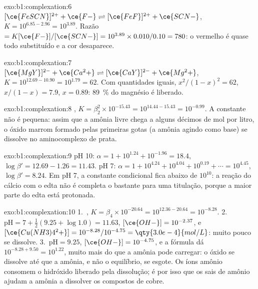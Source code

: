 \begin{solution}{exo:b1:complexation:6}
$[\ce{FeSCN}]^{2+} + \ce{F-} \rightleftharpoons [\ce{FeF}]^{2+} + \ce{SCN-}$,
$K = 10^{6.85 - 2.96} = 10^{3.89}$. Razão $= K[\ce{F-}]/[\ce{SCN-}] =
10^{3.89} \times 0.010/0.10 = 780$: o  vermelho é quase todo
substituído e a cor desaparece.
\end{solution}

\begin{solution}{exo:b1:complexation:7}
$[\ce{MgY}]^{2-} + \ce{Ca^2+} \rightleftharpoons [\ce{CaY}]^{2-} + \ce{Mg^2+}$,
$K = 10^{12.69 - 10.90} = 10^{1.79} = 62$. Com quantidades iguais,
$x^2/(1 - x)^2 = 62$, $x/(1 - x) = 7.9$, $x = 0.89$: \qty{89}{\percent} do
magnésio é liberado.
\end{solution}

\begin{solution}{exo:b1:complexation:8}
, $K = \beta_2^2 \times
10^{-15.43} = 10^{14.44 - 15.43} = 10^{-0.99}$. A constante não é
pequena: assim que a amônia livre chega a alguns décimos de mol por
litro, o óxido marrom formado pelas primeiras gotas (a amônia agindo
como base) se dissolve no aminocomplexo de prata.
\end{solution}

\begin{solution}{exo:b1:complexation:9}
pH 10: $\alpha = 1 + 10^{1.24} + 10^{-1.96} = 18.4$, $\log\beta' = 12.69 -
1.26 = 11.43$. pH 7: $\alpha = 1 + 10^{4.24} + 10^{4.04} + 10^{0.19} +
\cdots = 10^{4.45}$, $\log\beta' = 8.24$. Em pH 7, a constante condicional
fica abaixo de $10^{10}$: a reação do cálcio com o edta não é completa o
bastante para uma titulação, porque a maior parte do edta está protonada.
\end{solution}

\begin{solution}{exo:b1:complexation:10}
1.~, $K = \beta_4 \times
10^{-20.64} = 10^{12.36 - 20.64} = 10^{-8.28}$.
2.~$\mathrm{pH} = 7 + \frac12(9.25 + \log 1.0) = 11.63$, $[\ce{OH-}] =
10^{-2.37}$, e $[\ce{Cu(NH3)4^2+}] = 10^{-8.28}/10^{-4.75} =
\qty{3.0e-4}{mol/L}$: muito pouco se dissolve.
3.~$\mathrm{pH} = 9.25$, $[\ce{OH-}] = 10^{-4.75}$, e a fórmula dá
$10^{-8.28 + 9.50} = 10^{1.22}$, muito mais do que a amônia pode
carregar: o óxido se dissolve até que a amônia, e não o equilíbrio, se
esgote. Os íons amônio consomem o hidróxido liberado pela dissolução; é
por isso que os sais de amônio ajudam a amônia a dissolver os compostos
de cobre.
\end{solution}

